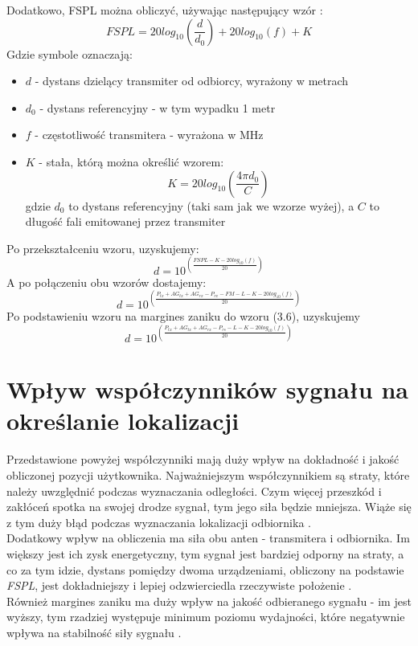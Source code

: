 Dodatkowo, FSPL można obliczyć, używając następujący wzór \cite{EN}:
\begin{equation}
FSPL = 20log_{10}\left(\frac{d}{d_{0}}\right) + 20log_{10}(f) + K
\end{equation}
Gdzie symbole oznaczają:
\begin{itemize}
	\item $d$ - dystans dzielący transmiter od odbiorcy, wyrażony w metrach
	\item $d_{0}$ - dystans referencyjny -  w tym wypadku 1 metr
	\item $f$ - częstotliwość transmitera - wyrażona w MHz
	\item $K$ - stała, którą można określić wzorem:
	\begin{equation}
	K = 20log_{10}\left(\frac{4\pi d_{0}}{C}\right)
	\end{equation}
	gdzie $d_{0}$ to dystans referencyjny (taki sam jak we wzorze wyżej), a $C$ to długość fali emitowanej przez transmiter
\end{itemize}	  
Po przekształceniu wzoru, uzyskujemy:
\begin{equation}
d = 10^{\left(\frac{FSPL - K - 20log_{10}(f)}{20}\right)}
\end{equation}
A po połączeniu obu wzorów dostajemy:
\begin{equation}
d = 10^{\left(\frac{P_{tx} + AG_{tx} + AG_{rx} - P_{rx} - FM - L - K - 20log_{10}(f)}{20}\right)}
\end{equation}
Po podstawieniu wzoru na margines zaniku do wzoru (3.6), uzyskujemy
\begin{equation}
d = 10^{\left(\frac{P_{tx} + AG_{tx} + AG_{rx} - P_{rs} - L - K - 20log_{10}(f)}{20}\right)}
\end{equation}
\section{Wpływ współczynników sygnału na określanie lokalizacji}
Przedstawione powyżej współczynniki mają duży wpływ na dokładność i jakość obliczonej pozycji użytkownika. Najważniejszym współczynnikiem są straty, które należy uwzględnić podczas wyznaczania odległości. Czym więcej przeszkód i zakłóceń spotka na swojej drodze sygnał, tym jego siła będzie mniejsza. Wiąże się z tym duży błąd podczas wyznaczania lokalizacji odbiornika \cite{RSC}.\\
Dodatkowy wpływ na obliczenia ma siła obu anten - transmitera i odbiornika. Im większy jest ich zysk energetyczny, tym sygnał jest bardziej odporny na straty, a co za tym idzie, dystans pomiędzy dwoma urządzeniami, obliczony na podstawie \textit{FSPL}, jest dokładniejszy i lepiej odzwierciedla rzeczywiste położenie \cite{FSPL}.\\
Również margines zaniku ma duży wpływ na jakość odbieranego sygnału - im jest wyższy, tym rzadziej występuje minimum poziomu wydajności, które negatywnie wpływa na stabilność siły sygnału \cite{MT}.

